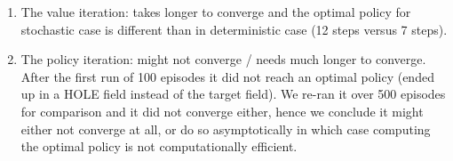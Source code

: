 \begin{enumerate}
\item The value iteration: takes longer to converge and the optimal policy for stochastic case is different than in deterministic case (12 steps versus 7 steps).
\item The policy iteration: might not converge / needs much longer to converge. After the first run of 100 episodes it did not reach an optimal policy (ended up in a HOLE field instead of the target field). We re-ran it over 500 episodes for comparison and it did not converge either, hence we conclude it might either not converge at all, or do so asymptotically in which case computing the optimal policy is not computationally efficient.
\end{enumerate}

